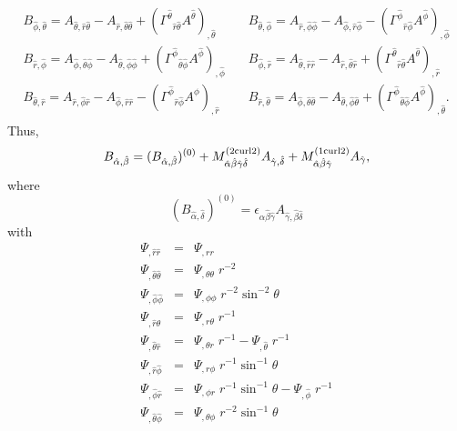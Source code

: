 \documentclass[\mydriver,12pt,twoside,notitlepage,a4paper]{article}
\begin{document}
\begin{eqnarray}
\begin{array}{lll}
B_{\hat\phi,\hat\theta}=
A_{\hat\theta,\hat r\hat\theta}-A_{\hat r,\hat\theta\hat\theta}+({\Gamma^{\hat\theta}}_{\hat r\hat\theta}A^{\hat\theta})_{,\hat\theta}
\quad&
B_{\hat\theta,\hat\phi}=
A_{\hat r,\hat\phi\hat\phi}-A_{\hat\phi,\hat r\hat\phi}-({\Gamma^{\hat\phi}}_{\hat r\hat\phi}A^{\hat\phi})_{,\hat\phi}
\\
B_{\hat r,\hat\phi}=
A_{\hat\phi,\hat\theta\hat\phi}-A_{\hat\theta,\hat\phi\hat\phi}+({\Gamma^{\hat\phi}}_{\hat\theta\hat\phi}A^{\hat\phi})_{,\hat\phi}
\quad&
B_{\hat\phi,\hat r}=
A_{\hat\theta,\hat r\hat r}-A_{\hat r,\hat\theta\hat r}+({\Gamma^{\hat\theta}}_{\hat r\hat\theta}A^{\hat\theta})_{,\hat r}
\\
B_{\hat\theta,\hat r}=
A_{\hat r,\hat\phi\hat r}-A_{\hat\phi,\hat r\hat r}-({\Gamma^{\hat\phi}}_{\hat r\hat\phi}A^{\hat\phi})_{,\hat r}
\quad&
B_{\hat r,\hat\theta}=
A_{\hat\phi,\hat\theta\hat\theta}-A_{\hat\theta,\hat\phi\hat\theta}+({\Gamma^{\hat\phi}}_{\hat\theta\hat\phi}A^{\hat\phi})_{,\hat\theta}.
\end{array}
\end{eqnarray}
Thus,
\begin{equation}
B_{\hat\alpha,\hat\beta}
=(B_{\hat\alpha,\hat\beta})^{(0)}
+M^{\rm(2curl2)}_{\hat\alpha\hat\beta\hat\gamma\hat\delta}
A_{\hat\gamma,\hat\delta}
+M^{\rm(1curl2)}_{\hat\alpha\hat\beta\hat\gamma}A_{\hat\gamma},
\end{equation}
where
\begin{equation}
(B_{\hat\alpha,\hat\delta})^{(0)}
=\epsilon_{\hat\alpha\hat\beta\hat\gamma}A_{\hat\gamma,\hat\beta\hat\delta}
\end{equation}
with
\begin{eqnarray}
\Psi_{,\hat r\hat r}&=&\Psi_{,rr}
\\
\Psi_{,\hat\theta\hat\theta}&=&\Psi_{,\theta\theta}\;r^{-2}
\\
\Psi_{,\hat\phi\hat\phi}&=&\Psi_{,\phi\phi}\;r^{-2}\sin^{-2}\!\theta
\\
\Psi_{,\hat r\hat\theta}&=&\Psi_{,r\theta}\;r^{-1}
\\
\Psi_{,\hat\theta\hat r}&=&\Psi_{,\theta r}\;r^{-1}
-\Psi_{,\hat\theta}\;r^{-1}
\\
\Psi_{,\hat r\hat\phi}&=&\Psi_{,r\phi}\;r^{-1}\sin^{-1}\!\theta
\\
\Psi_{,\hat\phi\hat r}&=&\Psi_{,\phi r}\;r^{-1}\sin^{-1}\!\theta
-\Psi_{,\hat\phi}\;r^{-1}
\\
\Psi_{,\hat\theta\hat\phi}&=&\Psi_{,\theta\phi}\;r^{-2}\sin^{-1}\!\theta
\end{eqnarray}
\end{document}
